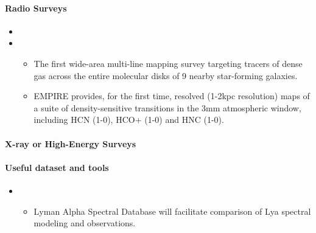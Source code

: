 \documentclass[letterpaper,10pt,english]{sphinxmanual}
\begin{document}
\paragraph{Radio Surveys}
\label{\detokenize{resource/astro/topics/extragalactic_astronomy:radio-surveys}}\begin{itemize}
\item {} 

\item {} 
\begin{itemize}
\item {} 
The first wide-area multi-line mapping survey targeting tracers of
dense gas across the entire molecular disks of 9 nearby
star-forming galaxies.

\item {} 
EMPIRE provides, for the first time, resolved (1-2kpc resolution)
maps of a suite of density-sensitive transitions in the 3mm
atmospheric window, including HCN (1-0), HCO+ (1-0) and HNC (1-0).

\end{itemize}

\end{itemize}


\paragraph{X-ray or High-Energy Surveys}
\label{\detokenize{resource/astro/topics/extragalactic_astronomy:x-ray-or-high-energy-surveys}}

\paragraph{Useful dataset and tools}
\label{\detokenize{resource/astro/topics/extragalactic_astronomy:useful-dataset-and-tools}}\begin{itemize}
\item {} 
\begin{itemize}
\item {} 
Lyman Alpha Spectral Database will facilitate comparison of Lya
spectral modeling and observations.

\end{itemize}

\end{itemize}
\end{document}
